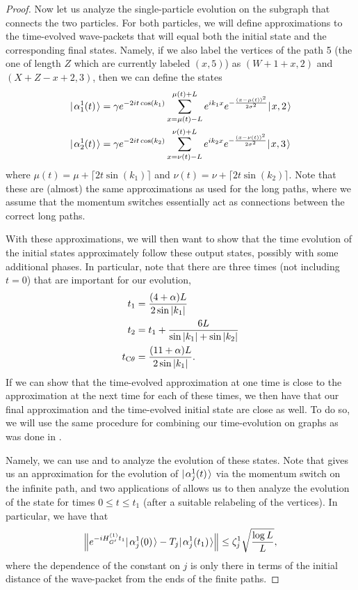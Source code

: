 \documentclass[../thesis-main/thesis-main]{subfiles}
\begin{document}
\begin{proof}
Now let us analyze the single-particle evolution on the subgraph that connects the two particles.  For both particles, we will define approximations to the time-evolved wave-packets that will equal both the initial state and the corresponding final states.  Namely, if we also label the vertices of the path 5 (the one of length $Z$ which are currently labeled $(x,5)$) as $(W+1+x,2)$ and $(X + Z - x+2,3)$, then we can define the states 
\begin{align}
  |\mspace{2mu} \alpha_{1}^1(t) \mspace{2mu} \rangle &= \gamma e^{-2 i t \cos(k_1)} \sum_{x = \mu(t) - L}^{\mu(t) + L} e^{ i k_1 x} e^{-\frac{(x-\mu(t))^2}{2\sigma^2}} |\mspace{2mu} x,2 \mspace{2mu} \rangle\\
  |\mspace{2mu} \alpha_{2}^1(t) \mspace{2mu} \rangle &= \gamma e^{-2 i t \cos(k_2)} \sum_{x = \nu(t) - L} ^{\nu(t) + L} e^{i k_2 x} e^{-\frac{(x-\nu(t))^2}{2\sigma^2}} |\mspace{2mu} x,3 \mspace{2mu} \rangle
\end{align}
where $\mu(t) = \mu + \lceil 2 t \sin (k_1)\rceil$ and $\nu(t) = \nu + \lceil 2 t \sin (k_2)\rceil$.  Note that these are (almost) the same approximations as used for the long paths, where we assume that the momentum switches essentially act as connections between the correct long paths.

With these approximations, we will then want to show that the time evolution of the initial states approximately follow these output states, possibly with some additional phases.  In particular, note that there are three times (not including $t=0$) that are important for our evolution,
\begin{align}
  t_1 &= \frac{(4 +  \alpha)L}{2 \sin |k_1|}\\
  t_2 &= t_1 + \frac{6L}{\sin |k_1| + \sin |k_2|}\\
  t_{\mathrm{C}\theta} &= \frac{(11 +\alpha) L}{2 \sin |k_1|}.\label{eq:t_CD_defn}
\end{align}
If we can show that the time-evolved approximation at one time is close to the approximation at the next time for each of these times, we then have that our final approximation and the time-evolved initial state are close as well.  To do so, we will use the same procedure for combining our time-evolution on graphs as was done in .

Namely, we can use  and  to analyze the evolution of these states.  Note that  gives us an approximation for the evolution of $|\mspace{2mu} \alpha^1_j(t) \mspace{2mu} \rangle$ via the momentum switch on the infinite path, and two applications of  allows us to then analyze the evolution of the state for times $0 \leq t \leq t_1$ (after a suitable relabeling of the vertices).  In particular, we have that 
\begin{align}
  \Big\Vert e^{-i H_{G'}^{(1)} t_1 } |\mspace{2mu} \alpha_j^{1}(0) \mspace{2mu} \rangle - T_j |\mspace{2mu} \alpha_j^{1}(t_1) \mspace{2mu} \rangle \Big\Vert \leq \zeta_j^1\sqrt{\frac{\log L}{L}},
  \label{eq:two_particle_gadget_single_bound_1}
\end{align}
where the dependence of the constant on $j$ is only there in terms of the initial distance of the wave-packet from the ends of the finite paths.  



\end{proof}
\end{document}
